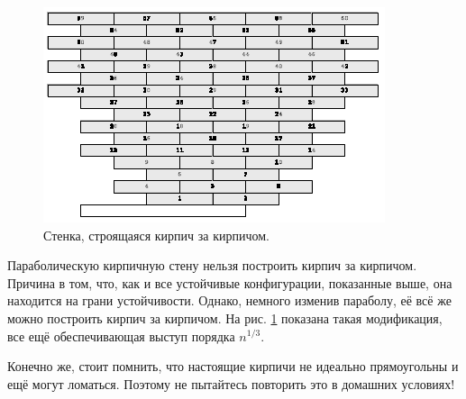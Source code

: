 \begin{figure}[htb!]
\centering
\includegraphics[scale=1]{pics/kirpich9}
\caption{Стенка, строящаяся кирпич за кирпичом.}
\label{pic:kirpich9}
\end{figure}

Параболическую кирпичную стену нельзя построить кирпич за кирпичом.
Причина в том, что, как и все устойчивые конфигурации, показанные выше, она находится на грани устойчивости.
Однако, немного изменив параболу, её всё же можно построить кирпич за кирпичом.
На рис. \ref{pic:kirpich9} показана такая модификация, все ещё обеспечивающая выступ порядка $n^{1/3}$.

Конечно же, стоит помнить, что настоящие кирпичи не идеально прямоугольны и ещё могут ломаться.
Поэтому не пытайтесь повторить это в домашних условиях!

